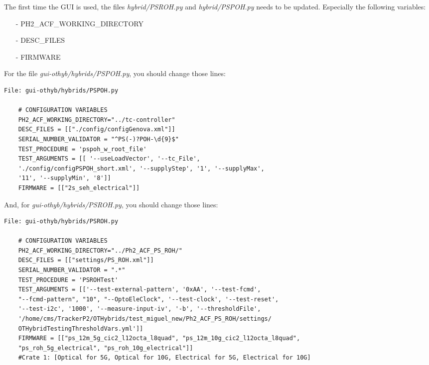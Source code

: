\documentclass[10pt,a4paper]{article}
\begin{document}
The first time the GUI is used, the files \emph{hybrid/PSROH.py} and \emph{hybrid/PSPOH.py} needs to be updated. Especially the following variables:
\begin{itemize}
\item[-] PH2\_ACF\_WORKING\_DIRECTORY
\item[-] DESC\_FILES
\item[-] FIRMWARE
\end{itemize}

For the file \emph{gui-othyb/hybrids/PSPOH.py}, you should change those lines:

\begin{framed}
\begin{verbatim}
File: gui-othyb/hybrids/PSPOH.py

    # CONFIGURATION VARIABLES
    PH2_ACF_WORKING_DIRECTORY="../tc-controller"
    DESC_FILES = [["./config/configGenova.xml"]]
    SERIAL_NUMBER_VALIDATOR = "^PS(-)?POH-\d{9}$"
    TEST_PROCEDURE = 'pspoh_w_root_file'
    TEST_ARGUMENTS = [[ '--useLoadVector', '--tc_File', 
    './config/configPSPOH_short.xml', '--supplyStep', '1', '--supplyMax', 
    '11', '--supplyMin', '8']]
    FIRMWARE = [["2s_seh_electrical"]] 

\end{verbatim}
\end{framed}

And, for \emph{gui-othyb/hybrids/PSROH.py}, you should change those lines:

\begin{framed}
\begin{verbatim}
File: gui-othyb/hybrids/PSROH.py

    # CONFIGURATION VARIABLES
    PH2_ACF_WORKING_DIRECTORY="../Ph2_ACF_PS_ROH/"
    DESC_FILES = [["settings/PS_ROH.xml"]]
    SERIAL_NUMBER_VALIDATOR = ".*"
    TEST_PROCEDURE = 'PSROHTest'
    TEST_ARGUMENTS = [['--test-external-pattern', '0xAA', '--test-fcmd', 
    "--fcmd-pattern", "10", "--OptoEleClock", '--test-clock', '--test-reset', 
    '--test-i2c', '1000', '--measure-input-iv', '-b', '--thresholdFile', 
    '/home/cms/TrackerP2/OTHybrids/test_miguel_new/Ph2_ACF_PS_ROH/settings/
    OTHybridTestingThresholdVars.yml']]
    FIRMWARE = [["ps_12m_5g_cic2_l12octa_l8quad", "ps_12m_10g_cic2_l12octa_l8quad", 
    "ps_roh_5g_electrical", "ps_roh_10g_electrical"]]       
    #Crate 1: [Optical for 5G, Optical for 10G, Electrical for 5G, Electrical for 10G]

\end{verbatim}
\end{framed}
\end{document}
